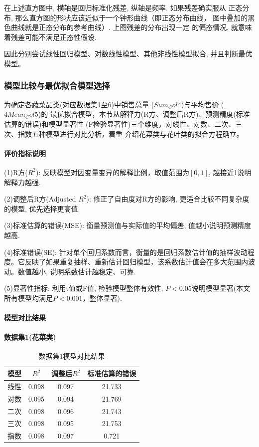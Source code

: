\documentclass{cumcmthesis}
\begin{document}
在上述直方图中, 横轴是回归标准化残差, 纵轴是频率. 如果残差确实服从
正态分布, 那么直方图的形状应该近似于一个钟形曲线（即正态分布曲线，
图中叠加的黑色曲线就是正态分布的参考曲线）. 上图残差的分布出现一定
的偏态情况, 就意味着残差可能不满足正态性假设.

因此分别尝试线性回归模型、对数线性模型、其他非线性模型拟合, 
并且判断最优模型。

\subsubsection{模型比较与最优拟合模型选择}

为确定各蔬菜品类(对应数据集1至6)中销售总量 ($Sum_Col4$)与平均售价 ($4Mean_Col5$)的
最优拟合模型，本节从解释力(R方、调整后R方)、预测精度(标准估算的错误)和模型显著性
(F检验显著性)三个维度，对线性、对数、二次、三次、指数五种模型进行对比分析，着重
介绍花菜类与花叶类的拟合方程确立。

\paragraph{评价指标说明}

\par
(1)R方($R^2$): 反映模型对因变量变异的解释比例，取值范围为$[0,1]$, 越接近1说明解释力越强.

(2)调整后R方(Adjusted $R^2$): 修正了自由度对R方的影响, 更适合比较不同复杂度的模型, 优先选择更高值.

(3)标准估算的错误(MSE): 衡量预测值与实际值的平均偏差, 值越小说明预测精度越高.

(4)标准错误(SE): 针对单个回归系数而言，衡量的是回归系数估计值的抽样波动程度。它反映了如果重复抽样、重新估计回归模型，该系数估计值会在多大范围内波动。数值越小, 说明系数估计越稳定、可靠.

(5)显著性指标: 利用t值或F值, 检验模型整体有效性, $P<0.05$说明模型显著(本文所有模型均满足$P<0.001$，整体显著).

\paragraph{模型对比结果}


\paragraph{数据集1(花菜类)}
\begin{table}[H]
\centering
\begin{tabular}{cccc}
\hline
模型 & $R^2$ & 调整后$R^2$ & 标准估算的错误 \\
\hline
线性 & 0.098 & 0.097 & 21.733 \\
对数 & 0.095 & 0.094 & 21.769 \\
二次 & 0.098 & 0.096 & 21.743 \\
三次 & 0.098 & 0.095 & 21.753 \\
指数 & 0.098 & 0.097 & 0.721 \\
\hline
\end{tabular}
\caption{数据集1模型对比结果}
\label{tab:dataset1}
\end{table}
\end{document}
